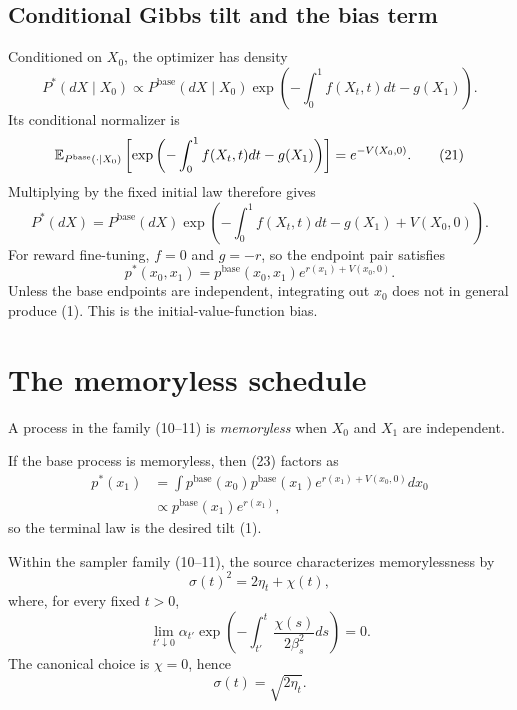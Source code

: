 \subsection{Conditional Gibbs tilt and the bias term}
Conditioned on $X_0$, the optimizer has density
\begin{equation*}
 P^*(dX\mid X_0)
 \propto
 P^{\mathrm{base}}(dX\mid X_0)
 \exp\left(-\int_0^1f(X_t,t)dt-g(X_1)\right).
 \tag{20}
\end{equation*}
Its conditional normalizer is
\begin{equation*}
 \mathbb{E}_{P^{\mathrm{base}}(\cdot\mid X_0)}
 \left[
 \exp\left(-\int_0^1f(X_t,t)dt-g(X_1)\right)
 \right]
 =e^{-V(X_0,0)}.
 \tag{21}
\end{equation*}
Multiplying by the fixed initial law therefore gives
\begin{equation*}
 P^*(dX)=P^{\mathrm{base}}(dX)
 \exp\left(-\int_0^1f(X_t,t)dt-g(X_1)+V(X_0,0)\right).
 \tag{22}
\end{equation*}
For reward fine-tuning, $f=0$ and $g=-r$, so the endpoint pair satisfies
\begin{equation*}
 p^*(x_0,x_1)=p^{\mathrm{base}}(x_0,x_1)
 e^{r(x_1)+V(x_0,0)}.
 \tag{23}
\end{equation*}
Unless the base endpoints are independent, integrating out $x_0$ does not in general produce (1).  This is the initial-value-function bias.

\section{The memoryless schedule}

\begin{definition}
A process in the family (10--11) is \emph{memoryless} when $X_0$ and $X_1$ are independent.
\end{definition}
If the base process is memoryless, then (23) factors as
\begin{align*}
 p^*(x_1)
 &=\int p^{\mathrm{base}}(x_0)p^{\mathrm{base}}(x_1)
 e^{r(x_1)+V(x_0,0)}dx_0\\
 &\propto p^{\mathrm{base}}(x_1)e^{r(x_1)},
 \tag{24}
\end{align*}
so the terminal law is the desired tilt (1).

\begin{proposition}
Within the sampler family (10--11), the source characterizes memorylessness by
\begin{equation*}
 \sigma(t)^2=2\eta_t+\chi(t),
 \tag{25a}
\end{equation*}
where, for every fixed $t>0$,
\begin{equation*}
 \lim_{t'\downarrow0}
 \alpha_{t'}
 \exp\left(
 -\int_{t'}^t\frac{\chi(s)}{2\beta_s^2}ds
 \right)=0.
 \tag{25b}
\end{equation*}
The canonical choice is $\chi=0$, hence
\begin{equation*}
 \sigma(t)=\sqrt{2\eta_t}.
 \tag{25c}
\end{equation*}
\end{proposition}

